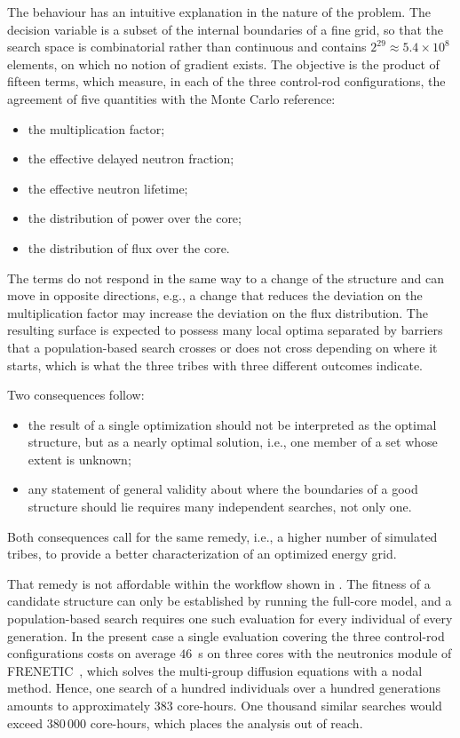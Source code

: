 The behaviour has an intuitive explanation in the nature of the problem. The
decision variable is a subset of the internal boundaries of a fine grid, so that
the search space is combinatorial rather than continuous and contains
$2^{29}\approx5.4\times10^{8}$ elements, on which no notion of gradient exists.
The objective is the product of fifteen terms, which measure, in each of the
three control-rod configurations, the agreement of five quantities with the
Monte Carlo reference:
\begin{itemize}
  \item the multiplication factor;
  \item the effective delayed neutron fraction;
  \item the effective neutron lifetime;
  \item the distribution of power over the core;
  \item the distribution of flux over the core.
\end{itemize}
The terms do not respond in the same way to a change of the
structure and can move in opposite directions, e.g., a change that reduces the
deviation on the multiplication factor may increase the deviation on the flux
distribution. The resulting surface is expected to possess many local optima
separated by barriers that a
population-based search crosses or does not cross depending on where it starts,
which is what the three tribes with three different outcomes indicate.

Two consequences follow:
\begin{itemize}
  \item the result of a single optimization should not be interpreted as the
    optimal structure, but as a nearly optimal solution, i.e., one member of a
    set whose extent is unknown;
  \item any statement of general validity about where the boundaries of a good
    structure should lie requires many independent searches, not only one.
\end{itemize}
Both consequences call for the same remedy, i.e., a higher number of simulated
tribes, to provide a better characterization of an optimized energy grid.

That remedy is not affordable within the workflow shown in \citet{prevMulti}. The fitness of a
candidate structure can only be established by running the full-core
model, and a population-based search requires one such evaluation for
every individual of every generation. In the present case a single evaluation
covering the three control-rod configurations costs on average $46$~s on three cores with
the neutronics module of FRENETIC~\cite{frenetic,freneticBench}, which solves the
multi-group diffusion equations with a nodal method. Hence, one
search of a hundred individuals over a hundred generations amounts to
approximately $383$ core-hours. One thousand similar searches would exceed
$380\,000$ core-hours, which places the analysis out of reach.

